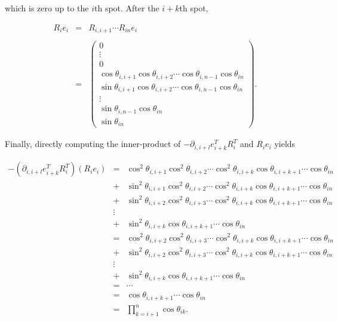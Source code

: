 \documentclass[ba]{imsart}
\numberwithin{equation}{section}
\theoremstyle{plain}
\begin{document}
\noindent which is zero up to the $i$th spot. After the $i+k$th spot,

\begin{eqnarray}
R_i e_i &=&   R_{i,i+1} \cdots R_{in} e_i \\
\\
&=&
\begin{pmatrix}
0\\
\vdots\\
0\\
\cos \theta_{i,i+1} \cos \theta_{i,i+2} \cdots \cos \theta_{i,n-1} \cos \theta_{in}\\
\sin \theta_{i,i+1} \cos \theta_{i,i+2} \cdots \cos \theta_{i,n-1} \cos \theta_{in}\\
\vdots\\
\sin \theta_{i,n-1} \cos \theta_{in}\\
\sin \theta_{in}
\end{pmatrix}.
\end{eqnarray}

\noindent Finally, directly computing the inner-product of $-\partial_{i,i+l} e_{i+k}^T R_i^T$ and $R_i e_i$ yields

\begin{eqnarray}
-(\partial_{i,i+l} e_{i+k}^T R_i^T) (R_i e_i)
&=&
\cos^2 \theta_{i,i+1} \cos^2 \theta_{i,i+2}  \cdots \cos^2 \theta_{i,i+k}  \cos \theta_{i,i+k+1} \cdots \cos \theta_{in} \nonumber\\
&+& \sin^2 \theta_{i,i+1} \cos^2 \theta_{i,i+2} \cdots \cos^2 \theta_{i,i+k}  \cos \theta_{i,i+k+1} \cdots \cos \theta_{in} \nonumber\\
&+&  \sin^2 \theta_{i,i+2} \cos^2 \theta_{i,i+3} \cdots \cos^2 \theta_{i,i+k}  \cos \theta_{i,i+k+1} \cdots \cos \theta_{in} \nonumber\\
&\vdots&  \nonumber\\
&+&  \sin^2 \theta_{i,i+k} \cos \theta_{i,i+k+1} \cdots \cos \theta_{in}
 \nonumber\\
&=&
\cos^2 \theta_{i,i+2} \cos^2 \theta_{i,i+3}  \cdots \cos^2 \theta_{i,i+k}  \cos \theta_{i,i+k+1} \cdots \cos \theta_{in}  \nonumber\\
&+&  \sin^2 \theta_{i,i+2} \cos^2 \theta_{i,i+3} \cdots \cos^2 \theta_{i,i+k}  \cos \theta_{i,i+k+1} \cdots \cos \theta_{in}  \nonumber\\
&\vdots&  \nonumber\\
&+&  \sin^2 \theta_{i,i+k} \cos \theta_{i,i+k+1} \cdots \cos \theta_{in}  \nonumber\\
&=& \cdots \nonumber\\
&=& \cos \theta_{i,i+k+1} \cdots \cos \theta_{in}\nonumber\\
&=& \prod_{k=i+1}^n \cos \theta_{ik}.
\end{eqnarray}
\end{document}
